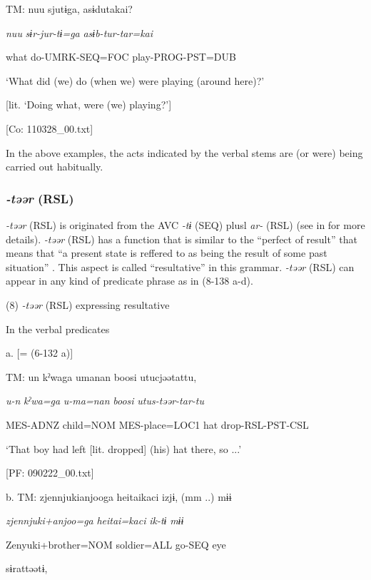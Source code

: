     TM:  nuu  sjutɨga,  asɨdutakai?

      \textit{nuu}  \textit{sɨr-jur-tɨ=ga}  \textit{asɨb-tur{}-tar=kai}

      what  do-UMRK-SEQ=FOC  play-PROG-PST=DUB

      ‘What did (we) do (when we) were playing (around here)?’

[lit. ‘Doing what, were (we) playing?’]

      [Co: 110328\_00.txt]

In the above examples, the acts indicated by the verbal stems are (or were) being carried out habitually.

\subsubsection{\textit{{}-təər} (RSL)}

\textit{{}-təər} (RSL) is originated from the AVC \textit{{}-tɨ} (SEQ) plusl \textit{ar-} (RSL) (see  in  for more details). \textit{{}-təər} (RSL) has a function that is similar to the “perfect of result” that means that “a present state is reffered to as being the result of some past situation” \citep[56]{Comrie1976}. This aspect is called “resultative” in this grammar. \textit{{}-təər} (RSL) can appear in any kind of predicate phrase as in (8-138 a-d).

(8)  \textit{{}-təər} (RSL) expressing resultative

  In the verbal predicates

  a.  [= (6-132 a)]

    TM:  un  kˀwaga  umanan  {\textbar}boosi{\textbar}  utucjəətattu,

      \textit{u-n}  \textit{kˀwa=ga}  \textit{u-ma=nan}  \textit{boosi}  \textit{utus-təər{}-tar-tu}

      MES-ADNZ  child=NOM  MES-place=LOC1  hat  drop-RSL-PST-CSL

      ‘That boy had left [lit. dropped] (his) hat there, so ...’

      [PF: 090222\_00.txt]

  b.  TM:  zjennjukianjooga  {\textbar}heitai{\textbar}kaci  izjɨ,  (mm ..)  mɨɨ

      \textit{zjennjuki+anjoo=ga}  \textit{heitai=kaci}  \textit{ik-tɨ}    \textit{mɨɨ}

      Zenyuki+brother=NOM  soldier=ALL  go-SEQ    eye

      sɨrattəətɨ,        

